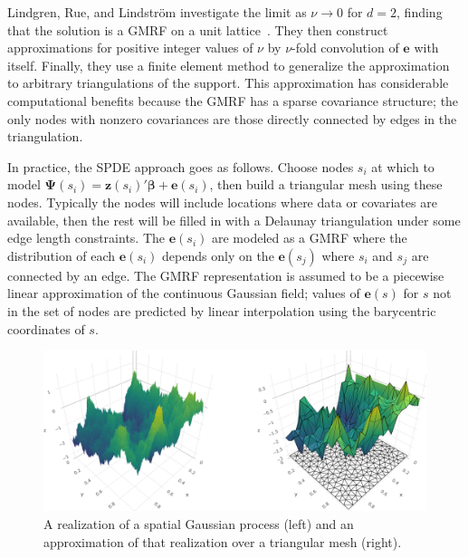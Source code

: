 \documentclass[]{interact}
\begin{document}
Lindgren, Rue, and Lindstr\"{o}m investigate the limit as \(\nu \to 0\) for
\(d = 2\), finding that the solution is a GMRF on a unit
lattice~\cite{lindgrenetal}. They then construct approximations for positive
integer values of \(\nu\) by \(\nu\)-fold convolution of \(\mathbf{e}\)
with itself. Finally, they use a finite element method to generalize the
approximation to arbitrary triangulations of the support. This approximation
has considerable computational benefits because the GMRF has a sparse
covariance structure; the only nodes with nonzero covariances are those
 directly connected by edges in the triangulation.

In practice, the SPDE approach goes as follows. Choose nodes \(s_{i}\)
at which to model \(\boldsymbol{\Psi}(s_{i})
= \mathbf{z}(s_{i})' \boldsymbol{\beta} + \mathbf{e}(s_{i})\), then build a
triangular mesh using these nodes. Typically the nodes will include locations
where data or covariates are available, then the rest will be filled in with a
Delaunay triangulation under some edge length constraints. The
\(\mathbf{e}(s_{i})\) are modeled as a GMRF where the distribution of
each \(\mathbf{e}(s_{i})\) depends only on the
\(\mathbf{e}(s_{j})\) where \(s_{i}\) and \(s_{j}\) are connected by an
edge. The GMRF representation is assumed to be a piecewise linear approximation
of the continuous Gaussian field; values of \(\mathbf{e}(s)\) for
\(s\) not in the set of nodes are predicted by linear interpolation using
the barycentric coordinates of \(s\).




\begin{figure}[p]
\includegraphics[width=\textwidth]{figures/surface.png}
\caption{A realization of a spatial Gaussian process (left) and an
approximation of that realization over a triangular mesh (right).}
\label{surface}
\end{figure}
\end{document}
